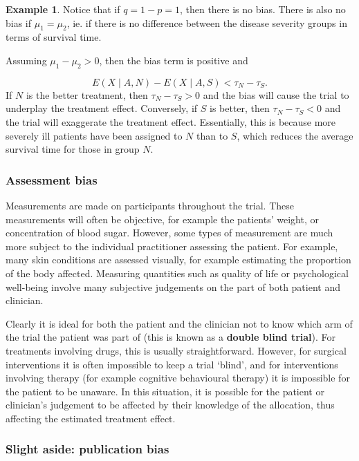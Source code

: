 \documentclass[
  openany]{book}
\theoremstyle{definition}
\theoremstyle{definition}
\newtheorem{example}{Example}[chapter]
\theoremstyle{definition}
\theoremstyle{definition}
\theoremstyle{remark}
\begin{document}
\begin{example}
Notice that if \(q=1-p = 1\), then there is no bias. There is also no bias if \(\mu_1 = \mu_2\), ie. if there is no difference between the disease severity groups in terms of survival time.

Assuming \(\mu_1 - \mu_2 >0\), then the bias term is positive and

\[E\left(X\mid{A,N}\right)- E\left(X\mid{A,S}\right) < \tau_N - \tau_S.\]
If \(N\) is the better treatment, then \(\tau_N - \tau_S>0\) and the bias will cause the trial to underplay the treatment effect. Conversely, if \(S\) is better, then \(\tau_N-\tau_S<0\) and the trial will exaggerate the treatment effect. Essentially, this is because more severely ill patients have been assigned to \(N\) than to \(S\), which reduces the average survival time for those in group \(N\).
\end{example}

\subsubsection*{Assessment bias}\label{assessment-bias}

Measurements are made on participants throughout the trial. These measurements will often be objective, for example the patients' weight, or concentration of blood sugar. However, some types of measurement are much more subject to the individual practitioner assessing the patient. For example, many skin conditions are assessed visually, for example estimating the proportion of the body affected. Measuring quantities such as quality of life or psychological well-being involve many subjective judgements on the part of both patient and clinician.

Clearly it is ideal for both the patient and the clinician not to know which arm of the trial the patient was part of (this is known as a \textbf{double blind trial}). For treatments involving drugs, this is usually straightforward. However, for surgical interventions it is often impossible to keep a trial `blind', and for interventions involving therapy (for example cognitive behavioural therapy) it is impossible for the patient to be unaware. In this situation, it is possible for the patient or clinician's judgement to be affected by their knowledge of the allocation, thus affecting the estimated treatment effect.

\subsubsection*{Slight aside: publication bias}\label{slight-aside-publication-bias}
\end{document}
